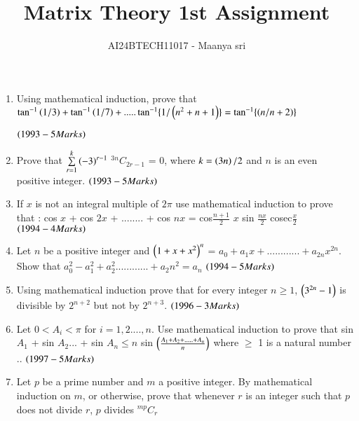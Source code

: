 \documentclass[journal,12pt,twocolumn]{IEEEtran}
\theoremstyle{remark}
\begin{document}

\vspace{3cm}

\title{Matrix Theory 1st Assignment}
\author{AI24BTECH11017 - Maanya sri}
\maketitle
\newpage
\bigskip

\renewcommand{\thefigure}{\theenumi}
\renewcommand{\thetable}{\theenumi}

\begin{enumerate}[start=16] 
\item Using mathematical induction, prove that $\tan^{-1}\left(1/3\right)  +  \tan^{-1}\left(1/7\right) + .....\tan^{-1}\{1/\left(n^2 + n + 1\right)\} = \tan^{-1}\{\left(n/n+2\right)\}$ 

$\hfill\textcolor{black}{\brak{1993-5 Marks} }$
\item Prove that $\sum\limits^{k}_{r=1} \left(-3\right)^{r-1}$ ${}^{3n}C_{2r-1}$ = $0$, where $k=\left(3n\right)/2$ and $n$ is an even positive integer.
$\hfill\textcolor{black}{\brak{1993-5 Marks} }$
\item If $x$ is not an integral multiple of $2\pi$ use mathematical induction to prove that : 
cos $x$ + cos $2x$ + ........ + cos $nx$ = cos$\frac{n+1}{2}$ $x$ sin $\frac{nx}{2}$ cosec$\frac{x}{2}$
$\hfill\textcolor{black}{\brak{1994-4 Marks} }$
\item 
Let $n$ be a positive integer and $\left(1+x+x^2\right)^n$ = $a_0 + a_1 x + ............+ a_{2n} x^{2n}$. Show that $a_0^2 - a_1^2 + a_2^2 ............ + a_2n^2 = a_n$
$\hfill\textcolor{black}{\brak{1994-5 Marks} }$
\item 
Using mathematical induction prove that for every integer $n \geq 1$, $\left(3^{2n} -1\right)$ is divisible by $2^{n+2}$ but not by $2^{n+3}$.
$\hfill\textcolor{black}{\brak{1996-3 Marks} }$
\item 
	Let $ 0<A_i<\pi$ for $i= 1,2....,n$. Use mathematical induction to prove that sin $A_1$ + sin $A_2$... + sin $A_n \leq  n$  sin $\left(\frac{A_1 + A_2 +.....+ A_n}{n}\right)$ where $\geq$ 1 is a natural number ..
$\hfill\textcolor{black}{\brak{1997-5 Marks} }$
\item 
Let $p$ be a prime number and $m$ a positive integer. By mathematical induction on $m$, or otherwise, prove that whenever $r$ is an integer such that $p$ does not divide $r$, $p$ divides ${}^{mp}C_r$ 

\end{enumerate}
\end{document}
